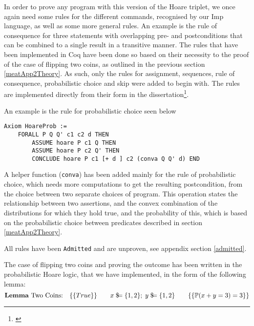 In order to prove any program with this version of the Hoare triplet, we once again need some rules for the different commands, recognised by our Imp language, as well as some more general rules. An example is the rule of consequence for three statements with overlapping pre- and postconditions that can be combined to a single result in a transitive manner. The rules that have been implemented in Coq have been done so based on their necessity to the proof of the case of flipping two coins, as outlined in the previous section \ref{meatApp2Theory}. As such, only the rules for assignment, sequences, rule of consequence, probabilistic choice and skip were added to begin with. The rules are implemented directly from their form in the dissertation\footnote{\textcite{PHdProbExtensions}}.

An example is the rule for probabilistic choice seen below

\begin{verbatim}
Axiom HoareProb :=
    FORALL P Q Q' c1 c2 d THEN
        ASSUME hoare P c1 Q THEN
        ASSUME hoare P c2 Q' THEN
        CONCLUDE hoare P c1 [+ d ] c2 (conva Q Q' d) END
\end{verbatim}

A helper function (\texttt{conva}) has been added mainly for the rule of probabilistic choice, which needs more computations to get the resulting postcondition, from the choice between two separate choices of program. This operation states the relationship between two assertions, and the convex combination of the distributions for which they hold true, and the probability of this, which is based on the probabilistic choice between predicates described in section \ref{meatApp2Theory}.

All rules have been \texttt{Admitted} and are unproven, see appendix section \ref{admitted}.

\label{meatApp2Coins}

The case of flipping two coins and proving the outcome has been written in the probabilistic Hoare logic, that we have implemented, in the form of the following lemma:
$$\text{\textbf{Lemma} Two Coins:}\quad \{\{ True \}\}\qquad x\; \$\!\!\! =\{1, 2\};\; y\; \$\!\!\! =\{1, 2\}\qquad \{\{\mathbb{P}(x + y = 3) = 3\}\}$$


